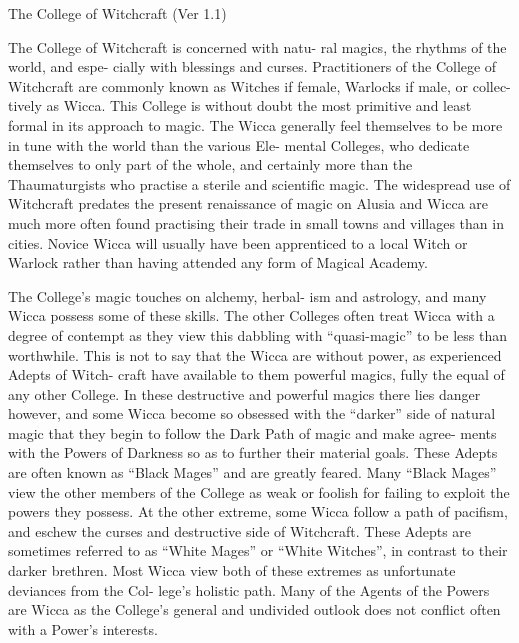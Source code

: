 \begin{Chapter}{The College of Witchcraft (Ver 1.1)}

The College of Witchcraft is concerned with natu-
ral  magics,  the  rhythms  of  the  world,  and  espe-
cially  with  blessings  and  curses.  Practitioners  of 
the College of Witchcraft are commonly known as 
Witches  if  female,  Warlocks  if  male,  or  collec-
tively as Wicca. This College is  without doubt the 
most  primitive  and  least  formal  in  its  approach  to 
magic.  The  Wicca  generally  feel  themselves  to  be 
more  in  tune  with  the  world  than  the  various  Ele-
mental  Colleges,  who  dedicate  themselves  to  only 
part  of  the  whole,  and  certainly  more  than  the 
Thaumaturgists who practise a sterile and scientific 
magic.  The  widespread  use  of  Witchcraft  predates 
the  present  renaissance  of  magic  on  Alusia  and 
Wicca  are  much  more  often  found  practising  their 
trade  in  small  towns  and  villages  than  in  cities. 
Novice  Wicca  will  usually  have  been  apprenticed 
to  a  local  Witch  or  Warlock  rather  than  having 
attended any form of Magical Academy. 

The  College’s  magic  touches  on  alchemy,  herbal-
ism  and  astrology,  and  many  Wicca  possess  some 
of  these  skills.  The  other  Colleges  often  treat 
Wicca with a degree of contempt as they view this 
dabbling  with  “quasi-magic”  to  be  less  than 
worthwhile.  This  is  not  to  say  that  the  Wicca  are 
without  power,  as  experienced  Adepts  of  Witch-
craft have available to them powerful magics, fully 
the equal of any other College. In these destructive 
and  powerful  magics  there  lies  danger  however, 
and  some  Wicca  become  so  obsessed  with  the 
“darker”  side  of  natural  magic  that  they  begin  to 
follow  the  Dark  Path  of  magic  and  make  agree-
ments with the Powers of Darkness so as to further 
their material goals. These Adepts are often known 
as  “Black  Mages”  and  are  greatly  feared.  Many 
“Black  Mages”  view  the  other  members  of  the 
College as weak or foolish for failing to exploit the 
powers  they  possess.  At  the  other  extreme,  some 
Wicca  follow  a  path  of  pacifism,  and  eschew  the 
curses  and  destructive  side  of  Witchcraft.  These 
Adepts  are  sometimes  referred  to  as  “White 
Mages”  or  “White  Witches”,  in  contrast  to  their 
darker  brethren.  Most  Wicca  view  both  of  these 
extremes  as  unfortunate  deviances  from  the  Col-
lege’s  holistic  path.  Many  of  the  Agents  of  the 
Powers  are  Wicca  as  the  College’s  general  and 
undivided  outlook  does  not  conflict  often  with  a 
Power’s interests. 


\end{Chapter}
